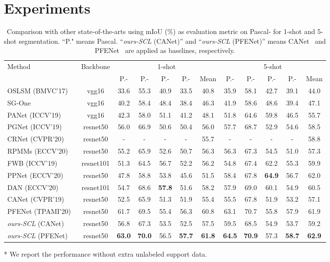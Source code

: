 \documentclass[final]{cvpr}
\begin{document}
\section{Experiments}
\begin{table*}[]
	\centering
	\caption{Comparison with other state-of-the-arts using mIoU (\%) as evaluation metric on Pascal- for 1-shot and 5-shot segmentation. ``P." means Pascal. ``\emph{ours-SCL} (CANet)'' and ``\emph{ours-SCL} (PFENet)'' means CANet~\cite{zhang2019canet} and PFENet~\cite{tian2020prior} are applied as baselines, respectively.}\label{tab:VOC_IOU}
	\begin{threeparttable}
	\begin{tabular}{lcccccc|ccccc}
		\hline
		\multirow{2}{*}{Method} & \multirow{2}{*}{Backbone}& \multicolumn{5}{c|}{1-shot}                          & \multicolumn{5}{c}{5-shot}                           \\ \cline{3-12} 
		&& P.- & P.- & P.- & P.- & Mean & P.- & P.-& P.- & P.- & Mean \\ \hline
		OSLSM (BMVC'17)~\cite{shaban2017one}&vgg16& 33.6& 55.3& 40.9& 33.5&40.8&35.9&58.1&42.7&39.1&44.0\\
SG-One~\cite{zhang2020sg}&vgg16& 40.2& 58.4& 48.4& 38.4& 46.3&41.9&58.6&48.6&39.4&47.1 \\
		PANet (ICCV'19)~\cite{wang2019panet}&vgg16&42.3&58.0& 51.1&41.2&48.1&51.8&64.6&59.8&46.5&55.7\\
		PGNet (ICCV'19)~\cite{zhang2019pyramid}&resnet50& 56.0& 66.9& 50.6& 50.4&56.0&57.7&68.7&52.9&54.6& 58.5\\
		CRNet (CVPR'20)~\cite{liu2020crnet}&resnet50& - & - & - & - & 55.7 & -  & -  & - & -  & 58.8 \\
		RPMMs (ECCV'20)~\cite{yang2020prototype}&resnet50&55.2&65.9&52.6&50.7&56.3&56.3&67.3&54.5&51.0&57.3\\
		FWB (ICCV'19)~\cite{nguyen2019feature}&resnet101&51.3& 64.5& 56.7&52.2&56.2&54.8&67.4&62.2&55.3&59.9\\
		PPNet\tnote{*} (ECCV'20)~\cite{liu2020part}&resnet50&47.8&58.8& 53.8&45.6&51.5&58.4&67.8&\textbf{64.9}&56.7&62.0\\ 
		DAN (ECCV'20)~\cite{wang2020few}&resnet101&54.7&68.6&\textbf{57.8}&51.6&58.2&57.9&69.0&60.1&54.9&60.5\\ \hline
		CANet (CVPR'19)~\cite{zhang2019canet}&resnet50& 52.5&65.9&51.3&51.9&55.4&55.5&67.8&51.9&53.2&57.1\\ 
		PFENet (TPAMI'20)~\cite{tian2020prior}&resnet50 &61.7&69.5&55.4&56.3&60.8&63.1&70.7&55.8&57.9&61.9\\ \hline
\emph{ours-SCL }(CANet) &resnet50&56.8&67.3&53.5&52.5&57.5 &59.5&68.5&54.9&53.7& 59.2\\ 
		\emph{ours-SCL }(PFENet)&resnet50 &\textbf{63.0}&\textbf{70.0}&56.5&\textbf{57.7}&\textbf{61.8} &\textbf{64.5}&\textbf{70.9}&57.3&\textbf{58.7}& \textbf{62.9}\\ \hline
	\end{tabular}
	\begin{tablenotes}
		\item[*] We report the performance without extra unlabeled support data.
	\end{tablenotes}
\end{threeparttable}
\end{table*}
\end{document}
